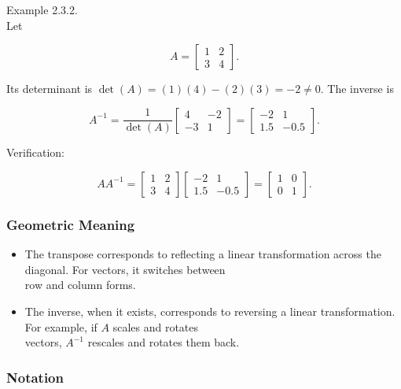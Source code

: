 \documentclass[
  12pt,
  a4paper,
]{article}
\begin{document}
Example 2.3.2.\\
Let

\[A = \begin{bmatrix}
1 & 2 \\
3 & 4
\end{bmatrix}.\]

Its determinant is \(\det(A) = (1)(4) - (2)(3) = -2 \neq 0\). The
inverse is

\[A^{-1} = \frac{1}{\det(A)} \begin{bmatrix}
4 & -2 \\
-3 & 1
\end{bmatrix} =
\begin{bmatrix}
-2 & 1 \\
1.5 & -0.5
\end{bmatrix}.\]

Verification:

\[AA^{-1} = \begin{bmatrix}
1 & 2 \\
3 & 4
\end{bmatrix}
\begin{bmatrix}
-2 & 1 \\
1.5 & -0.5
\end{bmatrix} =
\begin{bmatrix}
1 & 0 \\
0 & 1
\end{bmatrix}.\]

\subsubsection{Geometric Meaning}\label{geometric-meaning-2}

\begin{itemize}
\item
  The transpose corresponds to reflecting a linear transformation across
  the diagonal. For vectors, it switches between\\
  row and column forms.
\item
  The inverse, when it exists, corresponds to reversing a linear
  transformation. For example, if \(A\) scales and rotates\\
  vectors, \(A^{-1}\) rescales and rotates them back.
\end{itemize}

\subsubsection{Notation}\label{notation-6}
\end{document}
